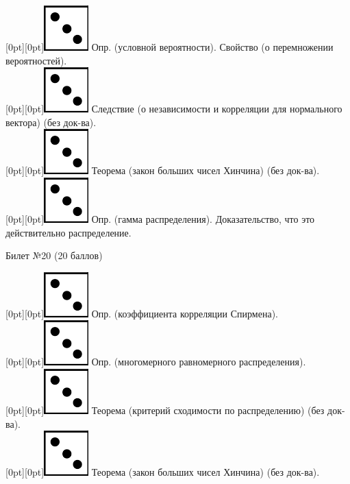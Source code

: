 \documentclass[10pt]{article}
\begin{document}
\raisebox{-1pt}[0pt][0pt]{\includegraphics[width=0.02\linewidth]{3.png}} Опр. (условной вероятности).  Свойство (о перемножении вероятностей). \\ 

\raisebox{-1pt}[0pt][0pt]{\includegraphics[width=0.02\linewidth]{3.png}} Следствие (о независимости и корреляции для нормального вектора) (без док-ва). \\ 

\raisebox{-1pt}[0pt][0pt]{\includegraphics[width=0.02\linewidth]{3.png}} Теорема (закон больших чисел Хинчина) (без док-ва). \\

\raisebox{-1pt}[0pt][0pt]{\includegraphics[width=0.02\linewidth]{3.png}} Опр. (гамма распределения). Доказательство, что это действительно распределение. \\

\begin{center} {\Large Билет №20 (20 баллов)} \end{center}

\raisebox{-1pt}[0pt][0pt]{\includegraphics[width=0.02\linewidth]{3.png}} Опр. (коэффициента корреляции Спирмена). \\

\raisebox{-1pt}[0pt][0pt]{\includegraphics[width=0.02\linewidth]{3.png}} Опр. (многомерного равномерного распределения). \\

\raisebox{-1pt}[0pt][0pt]{\includegraphics[width=0.02\linewidth]{3.png}} Теорема (критерий сходимости по распределению) (без док-ва). \\

\raisebox{-1pt}[0pt][0pt]{\includegraphics[width=0.02\linewidth]{3.png}} Теорема (закон больших чисел Хинчина) (без док-ва). \\
\end{document}
